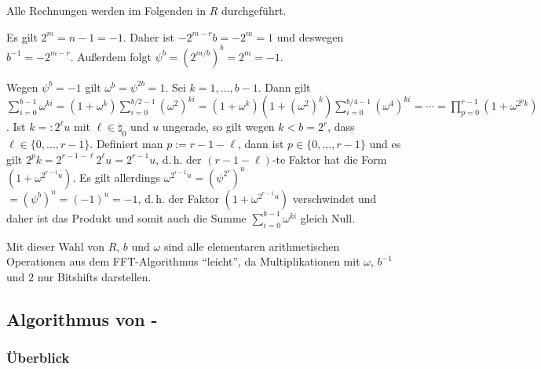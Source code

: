 \begin{Beweis}
    Alle Rechnungen werden im Folgenden in $R$ durchgeführt.
    
    Es gilt $2^m = n - 1 = -1$.
    Daher ist $-2^{m-r} b = -2^m = 1$ und deswegen $b^{-1} = -2^{m-r}$.
    Außerdem folgt $\psi^b = (2^{m/b})^b = 2^m = -1$.
    
    Wegen $\psi^b = -1$ gilt $\omega^b = \psi^{2b} = 1$.
    Sei $k = 1, \dotsc, b - 1$.
    Dann gilt\\
    $\sum_{i=0}^{b-1} \omega^{ki} = (1 + \omega^k) \sum_{i=0}^{b/2-1} (\omega^2)^{ki}
    = (1 + \omega^k) (1 + (\omega^2)^k) \sum_{i=0}^{b/4-1} (\omega^4)^{ki}
    = \dotsb
    = \prod_{p=0}^{r-1} (1 + \omega^{2^p k})$.
    Ist $k =: 2^\ell u$ mit $\ell \in \natural_0$ und $u$ ungerade,
    so gilt wegen $k < b = 2^r$, dass $\ell \in \{0, \dotsc, r - 1\}$.
    Definiert man $p := r - 1 - \ell$, dann ist $p \in \{0, \dotsc, r - 1\}$ und
    es gilt $2^p k = 2^{r-1-\ell} 2^\ell u = 2^{r-1} u$,
    d.\,h. der $(r-1-\ell)$-te Faktor hat die Form $(1 + \omega^{2^{r-1} u})$.
    Es gilt allerdings $\omega^{2^{r-1} u} = (\psi^{2^r})^u$\\
    $= (\psi^b)^u = (-1)^u = -1$,
    d.\,h. der Faktor $(1 + \omega^{2^{r-1} u})$ verschwindet und
    daher ist das Produkt und somit auch die Summe
    $\sum_{i=0}^{b-1} \omega^{ki}$ gleich Null.
\end{Beweis}

Mit dieser Wahl von $R$, $b$ und $\omega$ sind alle elementaren arithmetischen Operationen
aus dem FFT-Algorithmus "`leicht"', da Multiplikationen mit $\omega$, $b^{-1}$ und $2$ nur
Bitshifts darstellen.

\pagebreak

\subsection{%
    Algorithmus von -%
}

\subsubsection{%
    Überblick%
}


